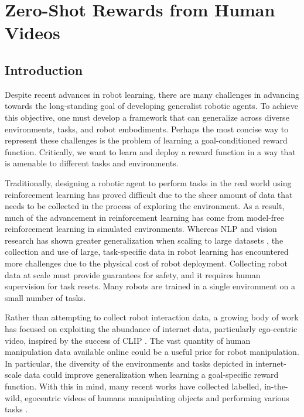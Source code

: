 \chapter{Zero-Shot Rewards from Human Videos}
\label{cha:reward}

\section{Introduction}
\label{sec:intro_reward}

Despite recent advances in robot learning, there are many challenges in advancing towards the long-standing goal of developing generalist robotic agents. To achieve this objective, one must develop a framework that can generalize across diverse environments, tasks, and robot embodiments. Perhaps the most concise way to represent these challenges is the problem of learning a goal-conditioned reward function. Critically, we want to learn and deploy a reward function in a way that is amenable to different tasks and environments.

Traditionally, designing a robotic agent to perform tasks in the real world using reinforcement learning has proved difficult due to the sheer amount of data that needs to be collected in the process of exploring the environment. As a result, much of the advancement in reinforcement learning has come from model-free reinforcement learning in simulated environments. Whereas NLP and vision research has shown greater generalization when scaling to large datasets \cite{gpt3}, the collection and use of large, task-specific data in robot learning has encountered more challenges due to the physical cost of robot deployment. Collecting robot data at scale must provide guarantees for safety, and it requires human supervision for task resets. Many robots are trained in a single environment on a small number of tasks. 

Rather than attempting to collect robot interaction data, a growing body of work has focused on exploiting the abundance of internet data, particularly ego-centric video, inspired by the success of CLIP \cite{radford21clip}. The vast quantity of human manipulation data available online could be a useful prior for robot manipulation. In particular, the diversity of the environments and tasks depicted in internet-scale data could improve generalization when learning a goal-specific reward function. With this in mind, many recent works have collected labelled, in-the-wild, egocentric videos of humans manipulating objects and performing various tasks \cite{ego4d, smthsmth, epickitchens}.

